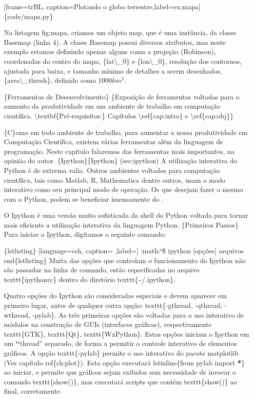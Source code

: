 \documentclass[a4paper,10pt,brazil]{sphinxmanual}
\begin{document}
{[}frame=trBL, caption=Plotando o globo terrestre,label=ex:mapa{]} \{code/mapa.py\}

Na listagem fig:mapa, criamos um objeto map, que é uma instância,
da classe Basemap (linha 4). A classe Basemap possui diversos
atributos, mas neste exemplo estamos definindo apenas alguns como a
projeção (Robinson), coordenadas do centro do mapa, \{lat\textbackslash{}\_0\} e
\{lon\textbackslash{}\_0\}, resolução dos contornos, ajustada para baixa, e tamanho
mínimo de detalhes a serem desenhados, \{area\textbackslash{}\_thresh\}, definido
como $1000 km^2$.

\{Ferramentas de Desenvolvimento\}
\{Exposição de ferramentas voltadas para o aumento da produtividade em um ambiente de trabalho em computação científica. \textbackslash{}textbf\{Pré-requisitos:\} Capítulos \textbackslash{}ref\{cap:intro\} e \textbackslash{}ref\{cap:obj\}\}

\{C\}omo em todo ambiente de trabalho, para aumentar a nossa
produtividade em Computação Científica, existem várias ferramentas
além da linguagem de programação. Neste capítulo falaremos das
ferramentas mais importantes, na opinião do autor.
\{Ipython\}\{Ipython\} (sec:ipython) A utilização interativa do Python
é de extrema valia. Outros ambientes voltados para computação
científica, tais como Matlab, R, Mathematica dentre outros, usam o
modo interativo como seu principal modo de operação. Os que desejam
fazer o mesmo com o Python, podem se beneficiar imensamente do
.

O Ipython é uma versão muito sofisticada da shell do Python voltada
para tornar mais eficiente a utilização interativa da linguagem
Python. \{Primeiros Passos\} Para iniciar o Ipython, digitamos o
seguinte comando:

\{lstlisting\} {[}language=csh, caption= ,label={]}
:math:{\color{red}\bfseries{}{}`}\$ ipython {[}opções{]} arquivos
end\{lstlisting\}
Muita das opções que controlam o funcionamento do Ipython não são passadas na linha de comando, estão especificadas no arquivo texttt\{ipythonrc\} dentro do diretório texttt\{\textasciitilde{}/.ipython\}.

Quatro opções do Ipython são consideradas especiais e devem aparecer em primeiro lugar, antes de qualquer outra opção: texttt\{-gthread, -qthread, -wthread, -pylab\}. As três primeiras opções são voltadas para o uso interativo de módulos na construção de GUIs (interfaces gráficas), respectivamente texttt\{GTK\}, texttt\{Qt\}, texttt\{WxPython\}. Estas opções iniciam o Ipython em um {\color{red}\bfseries{}{}`{}`}thread'' separado, de forma a permitir o controle interativo de elementos gráficos. A opção texttt\{-pylab\} permite o uso interativo do pacote matplotlib (Ver capítulo ref\{ch:plot\}). Esta opção executará lstinline\{from pylab import {\color{red}\bfseries{}*}\} ao iniciar, e permite que gráficos sejam exibidos sem necessidade de invocar o comando texttt\{show()\}, mas executará scripts que contém texttt\{show()\} ao final, corretamente.
\end{document}
